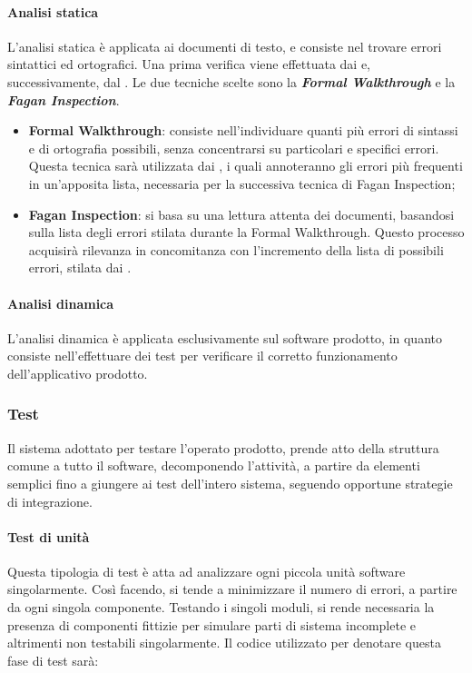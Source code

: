 			\paragraph{Analisi statica}
			L'analisi statica è applicata ai documenti di testo, e consiste nel trovare errori sintattici ed ortografici. Una prima verifica viene effettuata dai \textit{\Vers} e, successivamente, dal \textit{\RdP}. Le due tecniche scelte sono la \textbf{\textit{Formal Walkthrough}} e la \textbf{\textit{Fagan Inspection}}.
			\begin{itemize}
				\item \textbf{Formal Walkthrough}: consiste nell'individuare quanti più errori di sintassi e di ortografia possibili, senza concentrarsi su particolari e specifici errori. Questa tecnica sarà utilizzata dai \textit{\Vers}, i quali annoteranno gli errori più frequenti in un'apposita lista, necessaria per la successiva tecnica di Fagan Inspection;
				\item \textbf{Fagan Inspection}: si basa su una lettura attenta dei documenti, basandosi sulla lista degli errori stilata durante la Formal Walkthrough. Questo processo acquisirà rilevanza in concomitanza con l'incremento della lista di possibili errori, stilata dai \textit{\Vers}.
			\end{itemize}

			\paragraph{Analisi dinamica}
			L'analisi dinamica è applicata esclusivamente sul software prodotto, in quanto consiste nell'effettuare dei test per verificare il corretto funzionamento dell'applicativo prodotto.
	
			
		\subsubsection{Test}
		Il sistema adottato per testare l'operato prodotto, prende atto della struttura comune a tutto il software, decomponendo l'attività, a partire da elementi semplici fino a giungere ai test dell'intero sistema, seguendo opportune strategie di integrazione.
		
		\paragraph{Test di unità}
		Questa tipologia di test è atta ad analizzare ogni piccola unità software singolarmente. Così facendo, si tende a minimizzare il numero di errori, a partire da ogni singola componente. Testando i singoli moduli, si rende necessaria la presenza di componenti fittizie per simulare parti di sistema incomplete e altrimenti non testabili singolarmente. Il codice utilizzato per denotare questa fase di test sarà:
		
